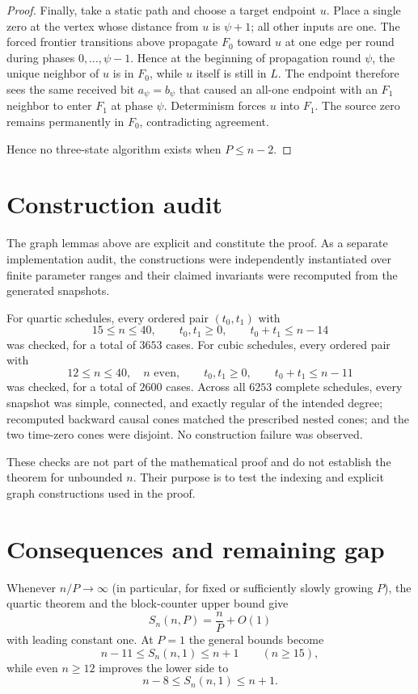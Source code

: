 \documentclass[11pt]{article}
\theoremstyle{remark}
\newcommand{\Fzero}{F_0}
\newcommand{\Fone}{F_1}
\newcommand{\Live}{L}
\begin{document}
\begin{proof}
Finally, take a static path and choose a target endpoint $u$.
Place a single zero at the vertex whose distance from $u$ is $\psi+1$; all other
inputs are one.  The forced frontier transitions above propagate $\Fzero$ toward
$u$ at one edge per round during phases $0,\ldots,\psi-1$.  Hence at the beginning
of propagation round $\psi$, the unique neighbor of $u$ is in $\Fzero$, while
$u$ itself is still in $\Live$.  The endpoint therefore sees the same received
bit $a_\psi=b_\psi$ that caused an all-one endpoint with an $\Fone$ neighbor to
enter $\Fone$ at phase $\psi$.  Determinism forces $u$ into $\Fone$.
The source zero remains permanently in $\Fzero$, contradicting agreement.

Hence no three-state algorithm exists when $P\le n-2$.
\end{proof}


\section{Construction audit}

The graph lemmas above are explicit and constitute the proof.  As a separate implementation
audit, the constructions were independently instantiated over finite parameter ranges and
their claimed invariants were recomputed from the generated snapshots.

For quartic schedules, every ordered pair $(t_0,t_1)$ with
\[
15\le n\le40,\qquad t_0,t_1\ge0,\qquad t_0+t_1\le n-14
\]
was checked, for a total of $3653$ cases.  For cubic schedules, every ordered pair with
\[
12\le n\le40,\quad n\text{ even},\qquad
t_0,t_1\ge0,\qquad t_0+t_1\le n-11
\]
was checked, for a total of $2600$ cases.  Across all $6253$ complete schedules, every
snapshot was simple, connected, and exactly regular of the intended degree; recomputed
backward causal cones matched the prescribed nested cones; and the two time-zero cones were
disjoint.  No construction failure was observed.

These checks are not part of the mathematical proof and do not establish the theorem for
unbounded $n$.  Their purpose is to test the indexing and explicit graph constructions used
in the proof.

\section{Consequences and remaining gap}

Whenever $n/P\to\infty$ (in particular, for fixed or sufficiently slowly growing $P$), the quartic theorem and the block-counter upper bound give
\[
S_n(n,P)=\frac{n}{P}+O(1)
\]
with leading constant one.  At $P=1$ the general bounds become
\[
n-11\le S_n(n,1)\le n+1
\qquad(n\ge15),
\]
while even $n\ge12$ improves the lower side to
\[
n-8\le S_n(n,1)\le n+1.
\]
\end{document}
